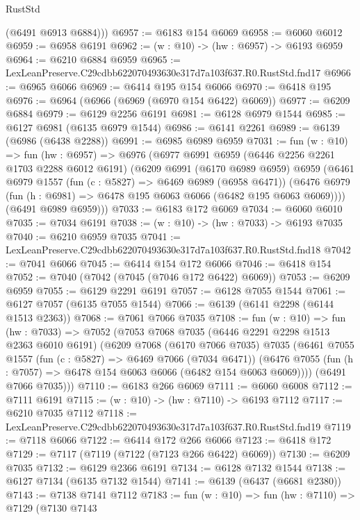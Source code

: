 \begin{lexlean}{RustStd}
\begin{coremodule}
        (@6491 @6913 @6884)))
@6957 := @6183 @154 @6069
@6958 := @6060 @6012
@6959 := @6958 @6191
@6962 := (w : @10) -> (hw : @6957) -> @6193 @6959
@6964 := @6210 @6884 @6959
@6965 := LexLeanPreserve.C29cdbb622070493630e317d7a103f637.R0.RustStd.fnd17
@6966 := @6965 @6066
@6969 := @6414 @195 @154 @6066
@6970 := @6418 @195
@6976 := @6964 (@6966 (@6969 (@6970 @154 @6422) @6069))
@6977 := @6209 @6884
@6979 := @6129 @2256 @6191
@6981 := @6128 @6979 @1544
@6985 := @6127 @6981 (@6135 @6979 @1544)
@6986 := @6141 @2261
@6989 := @6139 (@6986 (@6438 @2288))
@6991 := @6985 @6989 @6959
@7031 := fun (w : @10) =>
  fun (hw : @6957) =>
  @6976
    (@6977
      @6991
      @6959
      (@6446 @2256 @2261 @1703 @2288 @6012 @6191)
      (@6209
        @6991
        (@6170 @6989 @6959)
        @6959
        (@6461
          @6979
          @1557
          (fun (c : @5827) => @6469 @6989 (@6958 @6471))
          (@6476 @6979 (fun (h : @6981) => @6478 @195 @6063 @6066 (@6482 @195 @6063 @6069))))
        (@6491 @6989 @6959)))
@7033 := @6183 @172 @6069
@7034 := @6060 @6010
@7035 := @7034 @6191
@7038 := (w : @10) -> (hw : @7033) -> @6193 @7035
@7040 := @6210 @6959 @7035
@7041 := LexLeanPreserve.C29cdbb622070493630e317d7a103f637.R0.RustStd.fnd18
@7042 := @7041 @6066
@7045 := @6414 @154 @172 @6066
@7046 := @6418 @154
@7052 := @7040 (@7042 (@7045 (@7046 @172 @6422) @6069))
@7053 := @6209 @6959
@7055 := @6129 @2291 @6191
@7057 := @6128 @7055 @1544
@7061 := @6127 @7057 (@6135 @7055 @1544)
@7066 := @6139 (@6141 @2298 (@6144 @1513 @2363))
@7068 := @7061 @7066 @7035
@7108 := fun (w : @10) =>
  fun (hw : @7033) =>
  @7052
    (@7053
      @7068
      @7035
      (@6446 @2291 @2298 @1513 @2363 @6010 @6191)
      (@6209
        @7068
        (@6170 @7066 @7035)
        @7035
        (@6461
          @7055
          @1557
          (fun (c : @5827) => @6469 @7066 (@7034 @6471))
          (@6476 @7055 (fun (h : @7057) => @6478 @154 @6063 @6066 (@6482 @154 @6063 @6069))))
        (@6491 @7066 @7035)))
@7110 := @6183 @266 @6069
@7111 := @6060 @6008
@7112 := @7111 @6191
@7115 := (w : @10) -> (hw : @7110) -> @6193 @7112
@7117 := @6210 @7035 @7112
@7118 := LexLeanPreserve.C29cdbb622070493630e317d7a103f637.R0.RustStd.fnd19
@7119 := @7118 @6066
@7122 := @6414 @172 @266 @6066
@7123 := @6418 @172
@7129 := @7117 (@7119 (@7122 (@7123 @266 @6422) @6069))
@7130 := @6209 @7035
@7132 := @6129 @2366 @6191
@7134 := @6128 @7132 @1544
@7138 := @6127 @7134 (@6135 @7132 @1544)
@7141 := @6139 (@6437 (@6681 @2380))
@7143 := @7138 @7141 @7112
@7183 := fun (w : @10) =>
  fun (hw : @7110) =>
  @7129
    (@7130
      @7143

\end{coremodule}
\end{lexlean}
